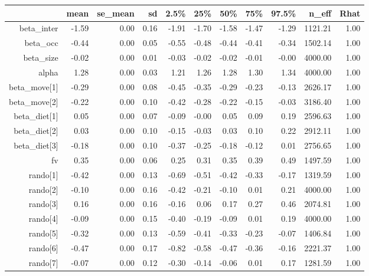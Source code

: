 \begin{table}[ht]
\centering
\begin{tabular}{rrrrrrrrrrr}
  \hline
 & mean & se\_mean & sd & 2.5\% & 25\% & 50\% & 75\% & 97.5\% & n\_eff & Rhat \\ 
  \hline
beta\_inter & -1.59 & 0.00 & 0.16 & -1.91 & -1.70 & -1.58 & -1.47 & -1.29 & 1121.21 & 1.00 \\ 
  beta\_occ & -0.44 & 0.00 & 0.05 & -0.55 & -0.48 & -0.44 & -0.41 & -0.34 & 1502.14 & 1.00 \\ 
  beta\_size & -0.02 & 0.00 & 0.01 & -0.03 & -0.02 & -0.02 & -0.01 & -0.00 & 4000.00 & 1.00 \\ 
  alpha & 1.28 & 0.00 & 0.03 & 1.21 & 1.26 & 1.28 & 1.30 & 1.34 & 4000.00 & 1.00 \\ 
  beta\_move[1] & -0.29 & 0.00 & 0.08 & -0.45 & -0.35 & -0.29 & -0.23 & -0.13 & 2626.17 & 1.00 \\ 
  beta\_move[2] & -0.22 & 0.00 & 0.10 & -0.42 & -0.28 & -0.22 & -0.15 & -0.03 & 3186.40 & 1.00 \\ 
  beta\_diet[1] & 0.05 & 0.00 & 0.07 & -0.09 & -0.00 & 0.05 & 0.09 & 0.19 & 2596.63 & 1.00 \\ 
  beta\_diet[2] & 0.03 & 0.00 & 0.10 & -0.15 & -0.03 & 0.03 & 0.10 & 0.22 & 2912.11 & 1.00 \\ 
  beta\_diet[3] & -0.18 & 0.00 & 0.10 & -0.37 & -0.25 & -0.18 & -0.12 & 0.01 & 2756.65 & 1.00 \\ 
  fv & 0.35 & 0.00 & 0.06 & 0.25 & 0.31 & 0.35 & 0.39 & 0.49 & 1497.59 & 1.00 \\ 
  rando[1] & -0.42 & 0.00 & 0.13 & -0.69 & -0.51 & -0.42 & -0.33 & -0.17 & 1319.59 & 1.00 \\ 
  rando[2] & -0.10 & 0.00 & 0.16 & -0.42 & -0.21 & -0.10 & 0.01 & 0.21 & 4000.00 & 1.00 \\ 
  rando[3] & 0.16 & 0.00 & 0.16 & -0.16 & 0.06 & 0.17 & 0.27 & 0.46 & 2074.81 & 1.00 \\ 
  rando[4] & -0.09 & 0.00 & 0.15 & -0.40 & -0.19 & -0.09 & 0.01 & 0.19 & 4000.00 & 1.00 \\ 
  rando[5] & -0.32 & 0.00 & 0.13 & -0.59 & -0.41 & -0.33 & -0.23 & -0.07 & 1406.84 & 1.00 \\ 
  rando[6] & -0.47 & 0.00 & 0.17 & -0.82 & -0.58 & -0.47 & -0.36 & -0.16 & 2221.37 & 1.00 \\ 
  rando[7] & -0.07 & 0.00 & 0.12 & -0.30 & -0.14 & -0.06 & 0.01 & 0.17 & 1281.59 & 1.00 \\ 

\end{tabular}
\end{table}
